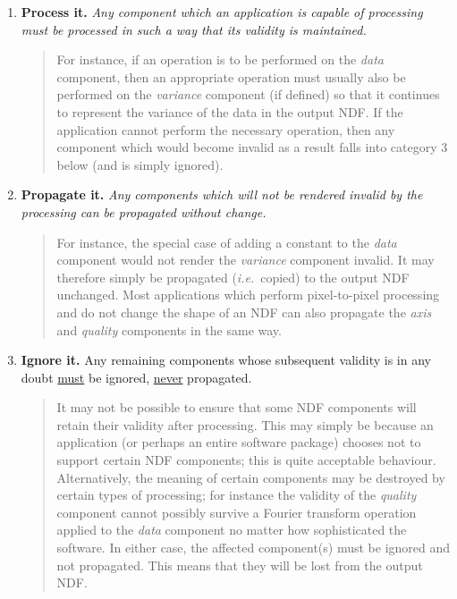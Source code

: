 \documentclass[twoside,11pt]{article}
\newcommand{\st}[1]{{\em{#1}}}
\begin{document}
\begin{enumerate}

\item {\bf Process it.}
\st{Any component which an application is capable of processing must be
processed in such a way that its validity is maintained.} 

\small
\begin{quote}
For instance, if an operation is to be performed on the \st{data\/} component,
then an appropriate operation must usually also be performed on the
\st{variance\/} component (if defined) so that it continues to
represent the variance 
of the data in the output NDF.
If the application cannot perform the necessary operation, then any
component which would become invalid as a result falls into category 3
below (and is simply ignored).
\end{quote}
\normalsize

\item {\bf Propagate it.}
\st{Any components which will not be rendered invalid by the processing
can be propagated without change.}

\small
\begin{quote}
For instance, the special case of adding a constant to the \st{data\/} component
would not render the \st{variance\/} component invalid. 
It may therefore simply be propagated (\st{i.e.}\ copied) to the output NDF 
unchanged.
Most applications which perform pixel-to-pixel processing and do not change 
the shape of an NDF can also propagate the \st{axis\/} and \st{quality\/}
components in the same way. 
\end{quote}
\normalsize

\item {\bf Ignore it.}
{Any remaining components whose subsequent validity is in any doubt
\underline{must} be ignored, \underline{never} propagated.} 

\small
\begin{quote}
It may not be possible to ensure that some NDF components will retain their 
validity after processing.
This may simply be because an application (or perhaps an entire software
package) chooses not to support certain NDF components; this is quite
acceptable behaviour.
Alternatively, the meaning of certain components may be destroyed by certain
types of processing; for instance the validity of the \st{quality\/} component
cannot possibly survive a Fourier transform operation applied to the \st{data\/}
component no matter how sophisticated the software.
In either case, the affected component(s) must be ignored and not 
propagated.
This means that they will be lost from the output NDF.

\end{quote}
\normalsize

\end{enumerate}
\end{document}
